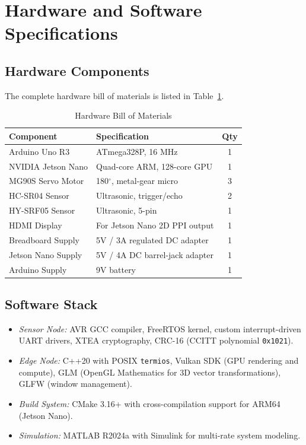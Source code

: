 \documentclass[conference]{IEEEtran}
\begin{document}
\section{Hardware and Software Specifications}
\label{sec:specs}

\subsection{Hardware Components}
The complete hardware bill of materials is listed in Table~\ref{tab:hardware}.

\begin{table}[htbp]
\caption{Hardware Bill of Materials}
\begin{center}
\begin{tabular}{llc}
\toprule
\textbf{Component} & \textbf{Specification} & \textbf{Qty} \\
\midrule
Arduino Uno R3 & ATmega328P, 16 MHz & 1 \\
NVIDIA Jetson Nano & Quad-core ARM, 128-core GPU & 1 \\
MG90S Servo Motor & 180$^\circ$, metal-gear micro & 3 \\
HC-SR04 Sensor & Ultrasonic, trigger/echo & 2 \\
HY-SRF05 Sensor & Ultrasonic, 5-pin & 1 \\
HDMI Display & For Jetson Nano 2D PPI output & 1 \\
Breadboard Supply & 5V / 3A regulated DC adapter & 1 \\
Jetson Nano Supply & 5V / 4A DC barrel-jack adapter & 1 \\
Arduino Supply & 9V battery & 1 \\
\bottomrule
\end{tabular}
\label{tab:hardware}
\end{center}
\end{table}


\subsection{Software Stack}
\begin{itemize}
    \item \textit{Sensor Node:} AVR GCC compiler, FreeRTOS kernel, custom interrupt-driven UART drivers, XTEA cryptography, CRC-16 (CCITT polynomial \texttt{0x1021}).
    \item \textit{Edge Node:} C++20 with POSIX \texttt{termios}, Vulkan SDK (GPU rendering and compute), GLM (OpenGL Mathematics for 3D vector transformations), GLFW (window management).
    \item \textit{Build System:} CMake 3.16+ with cross-compilation support for ARM64 (Jetson Nano).
    \item \textit{Simulation:} MATLAB R2024a with Simulink for multi-rate system modeling.
\end{itemize}
\end{document}
